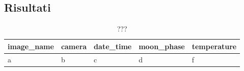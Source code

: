 \documentclass[12pt,a4paper,twoside]{article}
\begin{document}
\subsection{Risultati}

\begin{table}[h!]
    \centering
    \begin{tabular}{|l|l|l|l|l|}
        \hline
        \textbf{image\_name} & \textbf{camera} & \textbf{date\_time} & \textbf{moon\_phase} & \textbf{temperature} \\ 
        \hline
        a & b & c & d & f\\
        \hline
    \end{tabular}
    \caption{???}
\end{table}
\end{document}
